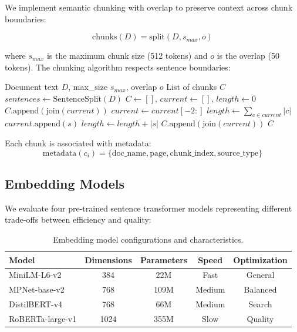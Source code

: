 \documentclass[runningheads]{llncs}
\begin{document}
We implement semantic chunking with overlap to preserve context across chunk boundaries:

\begin{equation}
\text{chunks}(D) = \text{split}(D, s_{max}, o)
\end{equation}

where $s_{max}$ is the maximum chunk size (512 tokens) and $o$ is the overlap (50 tokens). The chunking algorithm respects sentence boundaries:

\begin{algorithm}
\caption{Semantic Document Chunking}
\begin{algorithmic}[1]
\REQUIRE Document text $D$, max\_size $s_{max}$, overlap $o$
\ENSURE List of chunks $C$
\STATE $sentences \leftarrow \text{SentenceSplit}(D)$
\STATE $C \leftarrow []$, $current \leftarrow []$, $length \leftarrow 0$
        \STATE $C.\text{append}(\text{join}(current))$
        \STATE $current \leftarrow current[-2:]$ 
        \STATE $length \leftarrow \sum_{c \in current} |c|$
    \ENDIF
    \STATE $current.\text{append}(s)$
    \STATE $length \leftarrow length + |s|$
\ENDFOR
{}
    \STATE $C.\text{append}(\text{join}(current))$
\ENDIF
\RETURN $C$
\end{algorithmic}
\end{algorithm}

Each chunk is associated with metadata:
\begin{equation}
\text{metadata}(c_i) = \{\text{doc\_name}, \text{page}, \text{chunk\_index}, \text{source\_type}\}
\end{equation}

\subsection{Embedding Models}

We evaluate four pre-trained sentence transformer models representing different trade-offs between efficiency and quality:

\begin{table}[h]
\centering
\caption{Embedding model configurations and characteristics.}
\label{tab:embedding_models}
\begin{tabular}{lcccc}
\toprule
\textbf{Model} & \textbf{Dimensions} & \textbf{Parameters} & \textbf{Speed} & \textbf{Optimization} \\
\midrule
MiniLM-L6-v2 & 384 & 22M & Fast & General \\
MPNet-base-v2 & 768 & 109M & Medium & Balanced \\
DistilBERT-v4 & 768 & 66M & Medium & Search \\
RoBERTa-large-v1 & 1024 & 355M & Slow & Quality \\
\bottomrule
\end{tabular}
\end{table}
\end{document}
